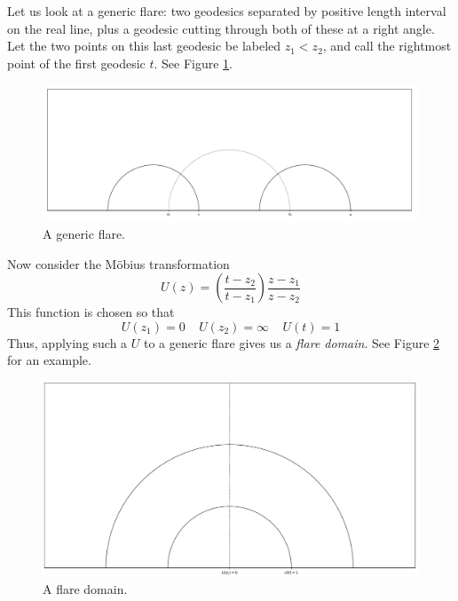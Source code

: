 \documentclass[]{article}
\begin{document}
Let us look at a generic flare: two geodesics separated by positive length interval on the real line, plus a geodesic cutting through both of these at a right angle.
Let the two points on this last geodesic be labeled $z_1 < z_2$, and call the rightmost point of the first geodesic $t$.
See Figure \ref{pre_flare}.
\begin{figure}[h]
	\centering
	\includegraphics[width=0.6\linewidth]{labeled_pre_flare.png}
	\caption{A generic flare.}
	\label{pre_flare}
\end{figure}
Now consider the M\"obius transformation
$$
U(z) = \left( \frac{t - z_2}{t - z_1} \right) \frac{z - z_1}{z - z_2}
$$
This function is chosen so that
$$
U(z_1) = 0 ~~~~~ U(z_2) = \infty ~~~~~ U(t) = 1
$$
Thus, applying such a $U$ to a generic flare gives us a \textit{flare domain}.
See Figure \ref{post_flare} for an example.
\begin{figure}[h]
	\centering
	\includegraphics[width=0.6\linewidth]{labeled_flare.png}
	\caption{A flare domain.}
	\label{post_flare}
\end{figure}
\end{document}
